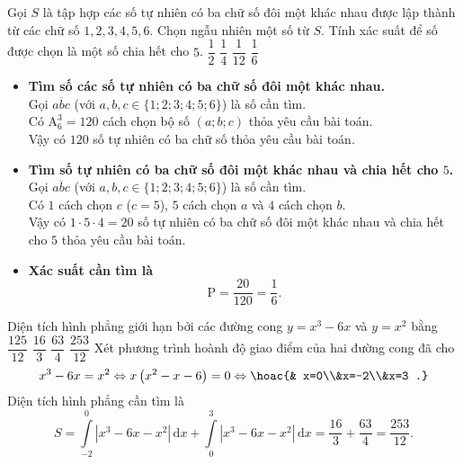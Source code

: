 \begin{ex}%
Gọi $S$ là tập hợp các số tự nhiên có ba chữ số đôi một khác nhau được lập thành từ các chữ số $1,2,3,4,5,6$. Chọn ngẫu nhiên một số từ $S$. Tính xác suất để số được chọn là một số chia hết cho $5$.
\choice 
{$\dfrac{1}{2}$} 
{$\dfrac{1}{4}$}
{$\dfrac{1}{12}$} 
{\True $\dfrac{1}{6}$}
\loigiai
{
\begin{itemize}
\item\textbf{Tìm số các số tự nhiên có ba chữ số đôi một khác nhau.}\\
Gọi $\overline{abc}$ (với $a,b,c\in\{1;2;3;4;5;6\}$) là số cần tìm.\\
Có $\mathrm{A}_6^3=120$ cách chọn bộ số $(a;b;c)$ thỏa yêu cầu bài toán.\\
Vậy có $120$ số tự nhiên có ba chữ số thỏa yêu cầu bài toán.
\item\textbf{Tìm số tự nhiên có ba chữ số đôi một  khác nhau và chia hết cho $5$.}\\
Gọi $\overline{abc}$ (với $a,b,c\in\{1;2;3;4;5;6\}$) là số cần tìm.\\
Có $1$ cách chọn $c$ ($c=5$), $5$ cách chọn $a$ và $4$ cách chọn $b$.\\
Vậy có $1\cdot 5\cdot 4=20$ số tự nhiên có ba chữ số đôi một khác nhau và chia hết cho $5$ thỏa yêu cầu bài toán.
\item \textbf{Xác suất cần tìm là} $$\mathrm{P}=\dfrac{20}{120}=\dfrac{1}{6}.$$
\end{itemize}
}
\end{ex}

\begin{ex}%
Diện tích hình phẳng giới hạn bởi các đường cong $y=x^3-6x$ và $y=x^2$ bằng
\choice 
{$\dfrac{125}{12}$} 
{$\dfrac{16}{3}$}
{$\dfrac{63}{4}$} 
{\True $\dfrac{253}{12}$}
\loigiai
{
Xét phương trình hoành độ giao điểm của hai đường cong đã cho $$x^3-6x=x^2\Leftrightarrow x\left (x^2-x-6 \right )=0\Leftrightarrow\hoac{& x=0\\&x=-2\\&x=3 .}$$
Diện tích hình phẳng cần tìm là
$$S=\displaystyle\int\limits_{-2}^{0}\left |x^3-6x-x^2 \right |\mathrm{\,d}x+\displaystyle\int\limits_{0}^{3}\left |x^3-6x-x^2 \right |\mathrm{\,d}x=\dfrac{16}{3}+\dfrac{63}{4}=\dfrac{253}{12}.$$
}
\end{ex}

